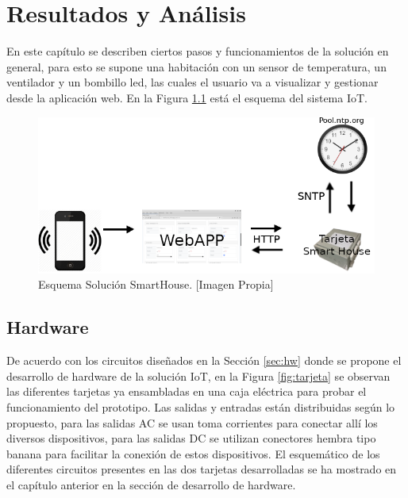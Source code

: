 \chapter{Resultados y Análisis}

En este capítulo se describen ciertos pasos y funcionamientos de la solución en general, para esto se supone una habitación con un sensor de temperatura, un ventilador y un bombillo led, las cuales el usuario va a visualizar y gestionar desde la aplicación web. En la Figura \ref{fig:iot} está el esquema del sistema IoT.

\begin{figure}[H]
	\centering
	\caption[Esquema Solución SmartHouse.]{Esquema Solución SmartHouse. [Imagen Propia]}
	\label{fig:iot}
	\includegraphics[width=0.6\linewidth]{Imagenes/IOT}
\end{figure}

\section{Hardware}

De acuerdo con los circuitos diseñados en la Sección \ref{sec:hw} donde se propone el desarrollo de hardware de la solución IoT, en la Figura \ref{fig:tarjeta} se observan las diferentes tarjetas ya ensambladas en una caja eléctrica para probar el funcionamiento del prototipo. Las salidas y entradas están distribuidas según lo propuesto, para las salidas AC se usan toma corrientes para conectar allí los diversos dispositivos, para las salidas DC se utilizan conectores hembra tipo banana para facilitar la conexión de estos dispositivos. El esquemático de los diferentes circuitos presentes en las dos tarjetas desarrolladas se ha mostrado en el capítulo anterior en la sección de desarrollo de hardware.\\

